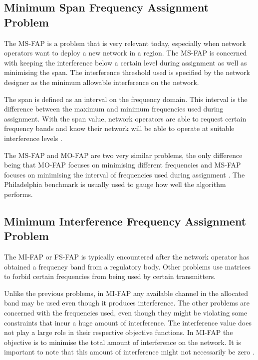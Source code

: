 \subsection{Minimum Span Frequency Assignment Problem}
The \gls{MS-FAP} is a problem that is very relevant today, especially when network operators want to deploy a new network in a region\cite{Karen2004}. The \gls{MS-FAP} is concerned with keeping the interference below a certain level during assignment as well as minimising the span\cite{MSFAP}. The interference threshold used is specified by the network designer as the minimum allowable interference on the network\cite{MSFAP}.

The span is defined as an interval on the frequency domain. This interval is the difference between the maximum and minimum frequencies used during assignment\cite{Karen2004,MSFAP}. With the span value, network operators are able to request certain frequency bands and know their network will be able to operate at suitable interference levels \cite{Karen2004,MSFAP}.

The \gls{MS-FAP} and \gls{MO-FAP} are two very similar problems, the only difference being that \gls{MO-FAP} focuses on minimising different frequencies and \gls{MS-FAP} focuses on minimising the interval of frequencies used during assignment \cite{Karen2004}. The Philadelphia benchmark is usually used to gauge how well the algorithm performs.
\subsection{Minimum Interference Frequency Assignment Problem}
The \gls{MI-FAP} or \gls{FS-FAP} is typically encountered after the network operator has obtained a frequency band from a regulatory body\cite{Karen2004}. Other problems use matrices to forbid certain frequencies from being used by certain transmitters\cite{MontemanniThesis}. 

Unlike the previous problems, in \gls{MI-FAP} any available channel in the allocated band may be used even though it produces interference. The other problems are concerned with the frequencies used, even though they might be violating some constraints that incur a huge amount of interference\cite{MontemanniThesis,MultipleBinaryFAP}. The interference value does not play a large role in their respective objective functions\cite{Eisenblatter,MultipleBinaryFAP}. In \gls{MI-FAP} the objective is to minimise the total amount of interference on the network. It is important to note that this amount of interference might not necessarily be zero \cite{Karen2004,Eisenblatter}.

